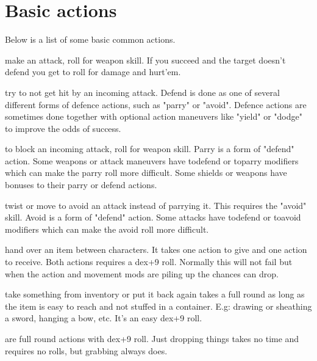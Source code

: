 
\section*{Basic actions}


Below is a list of some basic common actions.

\openactionslist


 make an attack, roll for weapon skill. If you succeed and the target doesn't defend you get to roll for damage and hurt'em.


 try to not get hit by an incoming attack. Defend is done as one of several different forms of defence actions, such as "parry" or "avoid". Defence actions are sometimes done together with optional action maneuvers like "yield" or "dodge" to improve the odds of success.


 to block an incoming attack, roll for weapon skill.
Parry is a form of "defend" action. Some weapons or attack maneuvers have todefend or toparry modifiers which can make the parry roll more difficult. Some shields or weapons have bonuses to their parry or defend actions.


 twist or move to avoid an attack instead of parrying it. This requires the "avoid" skill. Avoid is a form of "defend" action. Some attacks have todefend or toavoid modifiers which can make the avoid roll more difficult.


 hand over an item between characters. It takes one action to give and one action to receive. Both actions requires a dex+9 roll. Normally this will not fail but when the action and movement mods are piling up the chances can drop.


 take something from inventory or put it back again takes a full round as long as the item is easy to reach and not stuffed in a container. E.g: drawing or sheathing a sword, hanging a bow, etc. It's an easy dex+9 roll.


 are full round actions with dex+9 roll. Just dropping things takes no time and requires no rolls, but grabbing always does.


